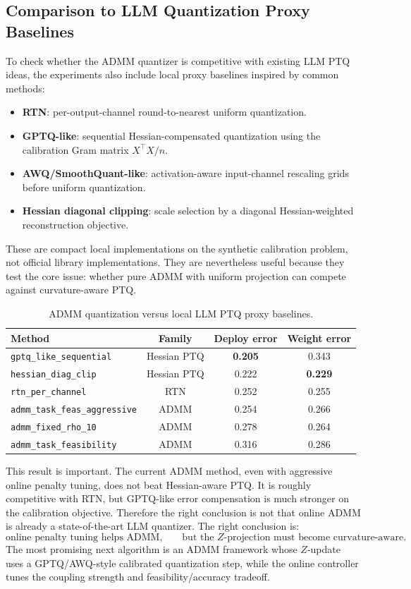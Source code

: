 \documentclass[11pt]{article}
\begin{document}
\subsection{Comparison to LLM Quantization Proxy Baselines}

To check whether the ADMM quantizer is competitive with existing LLM PTQ
ideas, the experiments also include local proxy baselines inspired by common
methods:
\begin{itemize}
    \item \textbf{RTN}: per-output-channel round-to-nearest uniform
    quantization.
    \item \textbf{GPTQ-like}: sequential Hessian-compensated quantization using
    the calibration Gram matrix \(X^\top X/n\).
    \item \textbf{AWQ/SmoothQuant-like}: activation-aware input-channel
    rescaling grids before uniform quantization.
    \item \textbf{Hessian diagonal clipping}: scale selection by a diagonal
    Hessian-weighted reconstruction objective.
\end{itemize}
These are compact local implementations on the synthetic calibration problem,
not official library implementations.  They are nevertheless useful because
they test the core issue: whether pure ADMM with uniform projection can compete
against curvature-aware PTQ.

\begin{table}[h]
\centering
\caption{ADMM quantization versus local LLM PTQ proxy baselines.}
\label{tab:llm-proxy-baselines}
\begin{tabular}{lccc}
\toprule
Method & Family & Deploy error & Weight error\\
\midrule
\texttt{gptq\_like\_sequential} & Hessian PTQ & \textbf{0.205} & 0.343\\
\texttt{hessian\_diag\_clip} & Hessian PTQ & 0.222 & \textbf{0.229}\\
\texttt{rtn\_per\_channel} & RTN & 0.252 & 0.255\\
\texttt{admm\_task\_feas\_aggressive} & ADMM & 0.254 & 0.266\\
\texttt{admm\_fixed\_rho\_10} & ADMM & 0.278 & 0.264\\
\texttt{admm\_task\_feasibility} & ADMM & 0.316 & 0.286\\
\bottomrule
\end{tabular}
\end{table}

This result is important.  The current ADMM method, even with aggressive online
penalty tuning, does not beat Hessian-aware PTQ.  It is roughly competitive
with RTN, but GPTQ-like error compensation is much stronger on the calibration
objective.  Therefore the right conclusion is not that online ADMM is already a
state-of-the-art LLM quantizer.  The right conclusion is:
\[
    \text{online penalty tuning helps ADMM,}
    \qquad
    \text{but the } Z\text{-projection must become curvature-aware.}
\]
The most promising next algorithm is an ADMM framework whose \(Z\)-update uses
a GPTQ/AWQ-style calibrated quantization step, while the online controller tunes
the coupling strength and feasibility/accuracy tradeoff.
\end{document}
